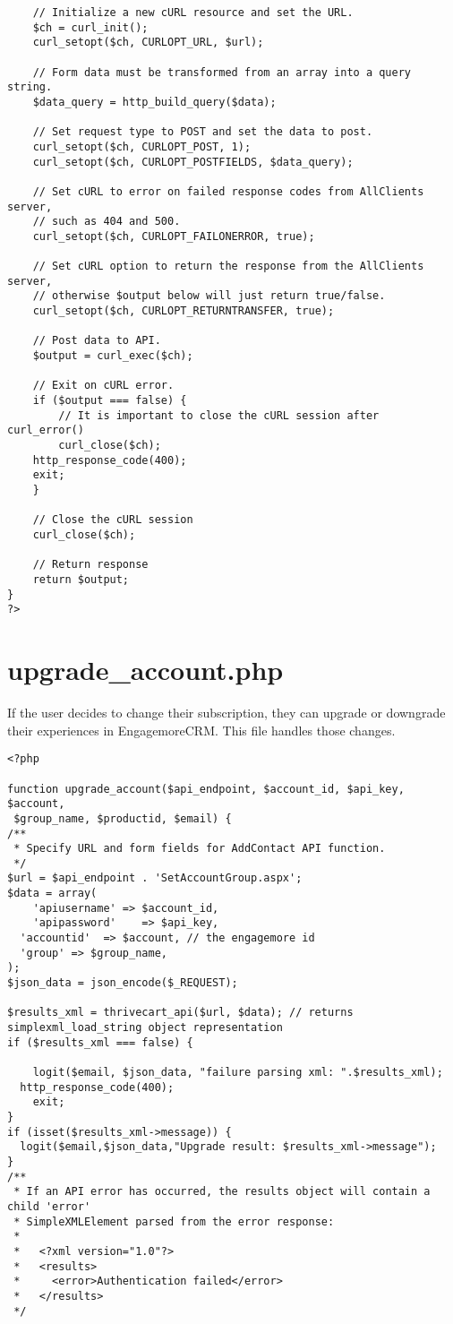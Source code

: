 \documentclass[final,letterpaper,12pt]{article}
\begin{document}
\begin{appendices}
\begin{verbatim}
	// Initialize a new cURL resource and set the URL.
	$ch = curl_init();
	curl_setopt($ch, CURLOPT_URL, $url);

	// Form data must be transformed from an array into a query string.
	$data_query = http_build_query($data);

	// Set request type to POST and set the data to post.
	curl_setopt($ch, CURLOPT_POST, 1);
	curl_setopt($ch, CURLOPT_POSTFIELDS, $data_query);

	// Set cURL to error on failed response codes from AllClients server,
	// such as 404 and 500.
	curl_setopt($ch, CURLOPT_FAILONERROR, true);

	// Set cURL option to return the response from the AllClients server,
	// otherwise $output below will just return true/false.
	curl_setopt($ch, CURLOPT_RETURNTRANSFER, true);

	// Post data to API.
	$output = curl_exec($ch);

	// Exit on cURL error.
	if ($output === false) {
		// It is important to close the cURL session after curl_error()
		curl_close($ch);
    http_response_code(400);
    exit;
	}

	// Close the cURL session
	curl_close($ch);

	// Return response
	return $output;
}
?>
\end{verbatim}
\section{upgrade\_account.php}
\noindent If the user decides to change their subscription, they can upgrade or downgrade their experiences in EngagemoreCRM.  This file handles those changes.
\begin{verbatim}
<?php

function upgrade_account($api_endpoint, $account_id, $api_key, $account,
 $group_name, $productid, $email) {
/**
 * Specify URL and form fields for AddContact API function.
 */
$url = $api_endpoint . 'SetAccountGroup.aspx';
$data = array(
	'apiusername' => $account_id,
	'apipassword'    => $api_key,
  'accountid'  => $account, // the engagemore id
  'group' => $group_name,
);
$json_data = json_encode($_REQUEST);

$results_xml = thrivecart_api($url, $data); // returns simplexml_load_string object representation
if ($results_xml === false) {

	logit($email, $json_data, "failure parsing xml: ".$results_xml);
  http_response_code(400);
	exit;
}
if (isset($results_xml->message)) {
  logit($email,$json_data,"Upgrade result: $results_xml->message");
}
/**
 * If an API error has occurred, the results object will contain a child 'error'
 * SimpleXMLElement parsed from the error response:
 *
 *   <?xml version="1.0"?>
 *   <results>
 *     <error>Authentication failed</error>
 *   </results>
 */


\end{verbatim}
\end{appendices}
\end{document}
